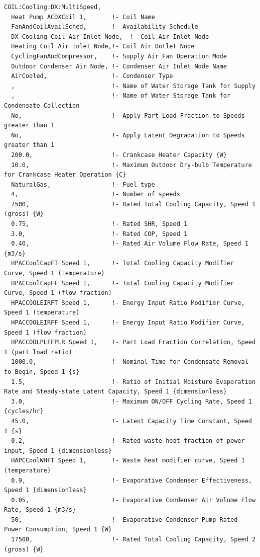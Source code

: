 \begin{lstlisting}
COIL:Cooling:DX:MultiSpeed,
  Heat Pump ACDXCoil 1,       !- Coil Name
  FanAndCoilAvailSched,       !- Availability Schedule
  DX Cooling Coil Air Inlet Node,  !- Coil Air Inlet Node
  Heating Coil Air Inlet Node,!- Coil Air Outlet Node
  CyclingFanAndCompressor,    !- Supply Air Fan Operation Mode
  Outdoor Condenser Air Node, !- Condenser Air Inlet Node Name
  AirCooled,                  !- Condenser Type
  ,                           !- Name of Water Storage Tank for Supply
  ,                           !- Name of Water Storage Tank for Condensate Collection
  No,                         !- Apply Part Load Fraction to Speeds greater than 1
  No,                         !- Apply Latent Degradation to Speeds greater than 1
  200.0,                      !- Crankcase Heater Capacity {W}
  10.0,                       !- Maximum Outdoor Dry-bulb Temperature for Crankcase Heater Operation {C}
  NaturalGas,                 !- Fuel type
  4,                          !- Number of speeds
  7500,                       !- Rated Total Cooling Capacity, Speed 1 (gross) {W}
  0.75,                       !- Rated SHR, Speed 1
  3.0,                        !- Rated COP, Speed 1
  0.40,                       !- Rated Air Volume Flow Rate, Speed 1 {m3/s}
  HPACCoolCapFT Speed 1,      !- Total Cooling Capacity Modifier Curve, Speed 1 (temperature)
  HPACCoolCapFF Speed 1,      !- Total Cooling Capacity Modifier Curve, Speed 1 (flow fraction)
  HPACCOOLEIRFT Speed 1,      !- Energy Input Ratio Modifier Curve, Speed 1 (temperature)
  HPACCOOLEIRFF Speed 1,      !- Energy Input Ratio Modifier Curve, Speed 1 (flow fraction)
  HPACCOOLPLFFPLR Speed 1,    !- Part Load Fraction Correlation, Speed 1 (part load ratio)
  1000.0,                     !- Nominal Time for Condensate Removal to Begin, Speed 1 {s}
  1.5,                        !- Ratio of Initial Moisture Evaporation Rate and Steady-state Latent Capacity, Speed 1 {dimensionless}
  3.0,                        !- Maximum ON/OFF Cycling Rate, Speed 1 {cycles/hr}
  45.0,                       !- Latent Capacity Time Constant, Speed 1 {s}
  0.2,                        !- Rated waste heat fraction of power input, Speed 1 {dimensionless}
  HAPCCoolWHFT Speed 1,       !- Waste heat modifier curve, Speed 1 (temperature)
  0.9,                        !- Evaporative Condenser Effectiveness, Speed 1 {dimensionless}
  0.05,                       !- Evaporative Condenser Air Volume Flow Rate, Speed 1 {m3/s}
  50,                         !- Evaporative Condenser Pump Rated Power Consumption, Speed 1 {W}
  17500,                      !- Rated Total Cooling Capacity, Speed 2 (gross) {W}

\end{lstlisting}
